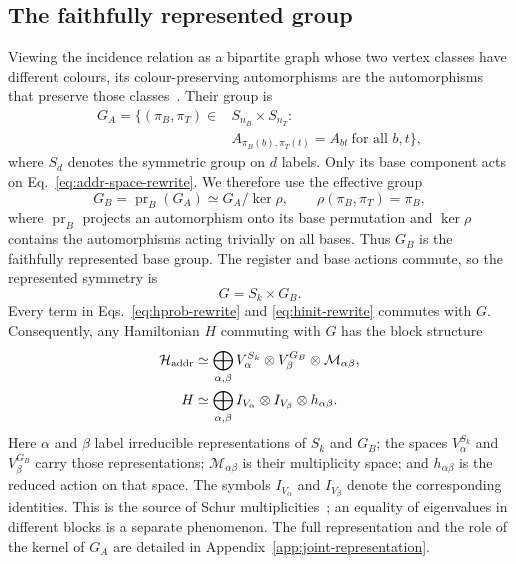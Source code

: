 \subsection{The faithfully represented group}

Viewing the incidence relation as a bipartite graph whose two vertex classes
have different colours, its colour-preserving automorphisms are the
automorphisms that preserve those classes~\cite{McKayPiperno2014}.  Their
group is
\begin{equation}
 \begin{split}
 G_A=\{(\pi_B,\pi_T)\in {}&S_{n_B}\times S_{n_T}:\\
 &A_{\pi_B(b),\pi_T(t)}=A_{bt}\ \text{for all }b,t\},
 \end{split}
\end{equation}
where $S_d$ denotes the symmetric group on $d$ labels.
Only its base component acts on Eq.~\eqref{eq:addr-space-rewrite}.  We
therefore use the effective group
\begin{equation}
 G_B=\operatorname{pr}_B(G_A)\simeq G_A/\ker\rho,
 \qquad \rho(\pi_B,\pi_T)=\pi_B,
 \label{eq:faithful-base-group}
\end{equation}
where $\operatorname{pr}_B$ projects an automorphism onto its base
permutation and $\ker\rho$ contains the automorphisms acting trivially on
all bases.  Thus $G_B$ is the faithfully represented base group.  The
register and base actions commute, so the
represented symmetry is
\begin{equation}
 G=S_k\times G_B.
\end{equation}
Every term in Eqs.~\eqref{eq:hprob-rewrite} and \eqref{eq:hinit-rewrite}
commutes with $G$.  Consequently, any Hamiltonian $H$ commuting with $G$
has the block structure
\begin{align}
 \mathcal H_{\rm addr}
 &\simeq\bigoplus_{\alpha,\beta}
 V_\alpha^{S_k}\otimes V_\beta^{G_B}\otimes\mathcal M_{\alpha\beta},\\
 H&\simeq\bigoplus_{\alpha,\beta}
 I_{V_\alpha}\otimes I_{V_\beta}\otimes h_{\alpha\beta}.
 \label{eq:commutant-rewrite}
\end{align}
Here $\alpha$ and $\beta$ label irreducible representations of $S_k$ and
$G_B$; the spaces $V_\alpha^{S_k}$ and $V_\beta^{G_B}$ carry those
representations; $\mathcal M_{\alpha\beta}$ is their multiplicity space;
and $h_{\alpha\beta}$ is the reduced action on that space.  The symbols
$I_{V_\alpha}$ and
$I_{V_\beta}$ denote the corresponding identities.  This is the source of
Schur multiplicities~\cite{Serre1977}; an equality of eigenvalues in
different blocks is a separate phenomenon.  The full representation and
the role of the kernel of $G_A$ are detailed in
Appendix~\ref{app:joint-representation}.

